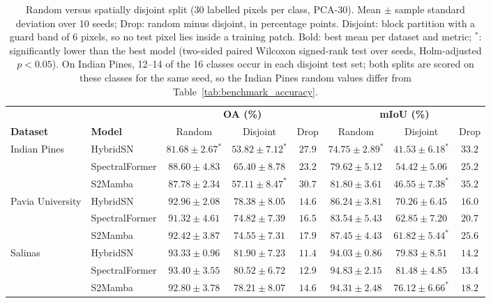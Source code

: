 \begin{table}[!t]
\centering
\caption{Random versus spatially disjoint split (30 labelled pixels per class, PCA-30). Mean $\pm$ sample standard deviation over 10 seeds; Drop: random minus disjoint, in percentage points. Disjoint: block partition with a guard band of 6 pixels, so no test pixel lies inside a training patch. Bold: best mean per dataset and metric; $^{*}$: significantly lower than the best model (two-sided paired Wilcoxon signed-rank test over seeds, Holm-adjusted $p<0.05$). On Indian Pines, 12--14 of the 16 classes occur in each disjoint test set; both splits are scored on these classes for the same seed, so the Indian Pines random values differ from Table~\ref{tab:benchmark_accuracy}.}
\label{tab:disjoint}
\scriptsize
\setlength{\tabcolsep}{3pt}
\renewcommand{\arraystretch}{1.15}
\begin{tabular}{llcccccc}
\toprule
 & & \multicolumn{3}{c}{\textbf{OA (\%)}} & \multicolumn{3}{c}{\textbf{mIoU (\%)}} \\
\cmidrule(lr){3-5}\cmidrule(lr){6-8}
\textbf{Dataset} & \textbf{Model} & Random & Disjoint & Drop & Random & Disjoint & Drop \\
\midrule
\multirow{3}{*}{Indian Pines} & HybridSN & $81.68 \pm 2.67^{*}$ & $53.82 \pm 7.12^{*}$ & $27.9$ & $74.75 \pm 2.89^{*}$ & $41.53 \pm 6.18^{*}$ & $33.2$ \\
 & SpectralFormer & $\mathbf{88.60 \pm 4.83}$ & $\mathbf{65.40 \pm 8.78}$ & $23.2$ & $79.62 \pm 5.12$ & $\mathbf{54.42 \pm 5.06}$ & $25.2$ \\
 & S2Mamba & $87.78 \pm 2.34$ & $57.11 \pm 8.47^{*}$ & $30.7$ & $\mathbf{81.80 \pm 3.61}$ & $46.55 \pm 7.38^{*}$ & $35.2$ \\
\midrule
\multirow{3}{*}{Pavia University} & HybridSN & $\mathbf{92.96 \pm 2.08}$ & $\mathbf{78.38 \pm 8.05}$ & $14.6$ & $86.24 \pm 3.81$ & $\mathbf{70.26 \pm 6.45}$ & $16.0$ \\
 & SpectralFormer & $91.32 \pm 4.61$ & $74.82 \pm 7.39$ & $16.5$ & $83.54 \pm 5.43$ & $62.85 \pm 7.20$ & $20.7$ \\
 & S2Mamba & $92.42 \pm 3.87$ & $74.55 \pm 7.31$ & $17.9$ & $\mathbf{87.45 \pm 4.43}$ & $61.82 \pm 5.44^{*}$ & $25.6$ \\
\midrule
\multirow{3}{*}{Salinas} & HybridSN & $93.33 \pm 0.96$ & $\mathbf{81.90 \pm 7.23}$ & $11.4$ & $94.03 \pm 0.86$ & $79.83 \pm 8.51$ & $14.2$ \\
 & SpectralFormer & $\mathbf{93.40 \pm 3.55}$ & $80.52 \pm 6.72$ & $12.9$ & $\mathbf{94.83 \pm 2.15}$ & $\mathbf{81.48 \pm 4.85}$ & $13.4$ \\
 & S2Mamba & $92.80 \pm 3.78$ & $78.21 \pm 8.07$ & $14.6$ & $94.31 \pm 2.48$ & $76.12 \pm 6.66^{*}$ & $18.2$ \\
\bottomrule
\end{tabular}
\end{table}
